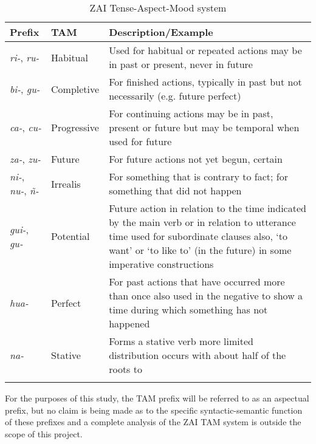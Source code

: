 \begin{table}

\begin{tabularx}{\textwidth}{llQ}
\lsptoprule
 Prefix & TAM & Description/Example \\
 
\midrule
\textit{ri-}, \textit{ru-} & Habitual & Used for habitual or repeated actions   may be in past or present, never in future \\
 
\midrule
\textit{bi-}, \textit{gu-} & Completive & For finished actions, typically in past   but not necessarily (e.g. future perfect) \\
 
\midrule
\textit{ca-}, \textit{cu-} &  Progressive & For continuing actions   may be in past, present or future  but may be temporal when used for future \\
  
\midrule 
 \textit{za-}, \textit{zu-} & Future & For future actions not yet begun, certain \\
 
\midrule
 \textit{ni-}, \textit{nu-}, \textit{ñ-} & Irrealis & For something that is contrary to fact;  for something that did not happen \\
 
\midrule
\textit{gui-}, \textit{gu-} & Potential & Future action   in relation to the time indicated by the main verb   or in relation to utterance time  
 used for subordinate clauses  also, `to want' or `to like to' (in the future)  in some imperative constructions \\
 
\midrule
\textit{hua-} & Perfect & For past actions that have occurred more than once  also used in the negative to show a time   during which something has not happened \\
  
\midrule
\textit{na-} & Stative & Forms a stative verb   more limited distribution occurs with about half of the roots to  \\
  
\lspbottomrule
 \end{tabularx}
\caption{{ZAI Tense-Aspect-Mood system}}
\label{TAMsystem}

\end{table} 


For the purposes of this study, the TAM prefix will be referred to as an aspectual prefix, but no claim is being made as to the specific syntactic-semantic function of these prefixes and a complete analysis of the ZAI TAM system is outside the scope of this project.

